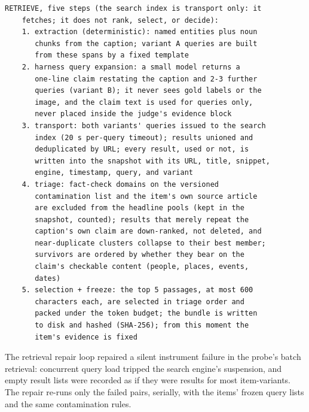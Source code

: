 \documentclass{article} %
\begin{document}
{\begin{verbatim}
RETRIEVE, five steps (the search index is transport only: it
    fetches; it does not rank, select, or decide):
    1. extraction (deterministic): named entities plus noun
       chunks from the caption; variant A queries are built
       from these spans by a fixed template
    2. harness query expansion: a small model returns a
       one-line claim restating the caption and 2-3 further
       queries (variant B); it never sees gold labels or the
       image, and the claim text is used for queries only,
       never placed inside the judge's evidence block
    3. transport: both variants' queries issued to the search
       index (20 s per-query timeout); results unioned and
       deduplicated by URL; every result, used or not, is
       written into the snapshot with its URL, title, snippet,
       engine, timestamp, query, and variant
    4. triage: fact-check domains on the versioned
       contamination list and the item's own source article
       are excluded from the headline pools (kept in the
       snapshot, counted); results that merely repeat the
       caption's own claim are down-ranked, not deleted, and
       near-duplicate clusters collapse to their best member;
       survivors are ordered by whether they bear on the
       claim's checkable content (people, places, events,
       dates)
    5. selection + freeze: the top 5 passages, at most 600
       characters each, are selected in triage order and
       packed under the token budget; the bundle is written
       to disk and hashed (SHA-256); from this moment the
       item's evidence is fixed
\end{verbatim}}

The retrieval repair loop repaired a silent instrument failure in the probe's batch retrieval: concurrent query load tripped the search engine's suspension, and empty result lists were recorded as if they were results for most item-variants. The repair re-runs only the failed pairs, serially, with the items' frozen query lists and the same contamination rules.
\end{document}

